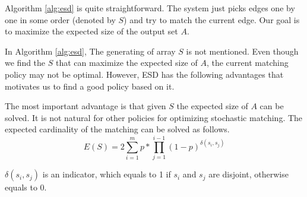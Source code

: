 \documentclass[letterpaper]{article}
\begin{document}
Algorithm \ref{alg:esd} is quite straightforward. The system just picks edges one by one in some order (denoted by $S$) and try to match the current edge. Our goal is to maximize the expected size of the output set $A$.

In Algorithm \ref{alg:esd}, The generating of array $S$ is not mentioned.
Even though we find the $S$ that can maximize the expected size of $A$, the current matching policy may not be optimal.
However, ESD has the following advantages that motivates us to find a good policy based on it.

The most important advantage is that given $S$ the expected size of $A$ can be solved. It is not natural for other policies for optimizing stochastic matching. The expected cardinality of the matching can be solved as follows.
\begin{equation}
E(S)=2\sum_{i=1}^m p*\prod_{j=1}^{i-1}(1-p)^{\delta(s_i,s_j)}
\end{equation}

$\delta(s_i,s_j)$ is an indicator, which equals to 1 if $s_i$ and $s_j$ are disjoint, otherwise equals to 0.



\newpage


\end{document}
